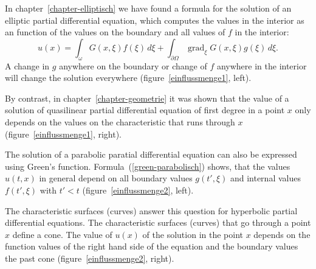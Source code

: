 In chapter~\ref{chapter-elliptisch} we have found a formula for the solution
of an elliptic partial differential equation, which computes the 
values in the interior as an function of the values on the boundary
and all values of $f$ in the interior:
\[
u(x)
=
\int_\omega G(x,\xi)f(\xi)\,d\xi
+
\int_{\partial\Omega} \operatorname{grad}_\xi G(x,\xi)g(\xi)\,d\xi.
\]
A change in $g$ anywhere on the boundary or change of $f$ anywhere in the
interior will change the solution everywhere
(figure~\ref{einflussmenge1}, left).

By contrast, in chapter~\ref{chapter-geometrie} it was shown that
the value of a solution of quasilinear partial differential
equation of first degree in a point $x$ only depends on the values on
the characteristic that runs through $x$
(figure~\ref{einflussmenge1}, right).

The solution of a parabolic paratial differential equation can also be
expressed using Green's function.
Formula~(\ref{green-parabolisch}) shows, that the values $u(t,x)$
in general depend on all boundary values
$g(t',\xi)$ and internal values $f(t',\xi)$
with $t'<t$ (figure~\ref{einflussmenge2}, left).

The characteristic surfaces (curves) answer this question for hyperbolic
partial differential equations.
The characteristic surfaces (curves) that go through a point $x$
define a cone.
The value of $u(x)$ of the solution in the point $x$ depends on the
function values of the right hand side of the equation and the boundary values
the past cone
(figure~\ref{einflussmenge2}, right).

